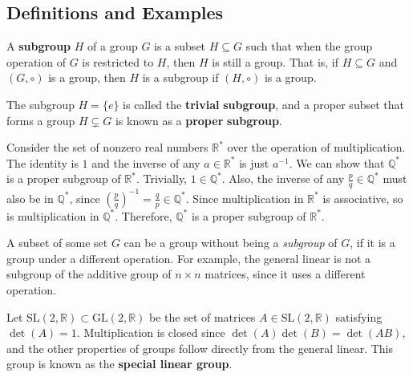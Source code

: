 \documentclass[12pt, letterpaper]{report}
\begin{document}
\subsection*{Definitions and Examples}
\begin{definition}[Subgroup]
	A \textbf{subgroup} \(H\) of a group \(G\) is a subset \(H \subseteq G\) such that when the group operation of \(G\) is restricted to \(H\), then \(H\) is still a group. That is, if \(H\subseteq G\) and \((G,\circ )\) is a group, then \(H\) is a subgroup if \((H,\circ )\) is a group.
\end{definition}
\begin{remark}
	The subgroup \(H=\{ e \} \) is called the \textbf{trivial} \textbf{subgroup}, and a proper subset that forms a group \(H \subsetneq G\) is known as a \textbf{proper} \textbf{subgroup}.
\end{remark}
\begin{eg}
	Consider the set of nonzero real numbers \(\mathbb{R} ^*\) over the operation of multiplication. The identity is \(1\) and the inverse of any \(a\in\mathbb{R} ^*\) is just \(a^{-1} \). We can show that \(\mathbb{Q} ^*\) is a proper subgroup of \(\mathbb{R} ^*\). Trivially, \(1\in\mathbb{Q}^* \). Also, the inverse of any \(\frac{p}{q}\in\mathbb{Q}^* \) must also be in \(\mathbb{Q}^* \), since \(\left( \frac{p}{q} \right)^{-1} =\frac{q}{p}\in\mathbb{Q} ^*\). Since multiplication in \(\mathbb{R} ^*\) is associative, so is multiplication in \(\mathbb{Q} ^*\). Therefore, \(\mathbb{Q} ^*\) is a proper subgroup of \(\mathbb{R} ^*\).
\end{eg}
\begin{remark}
	A subset of some set \(G\) can be a group without being a \emph{subgroup} of \(G\), if it is a group under a different operation. For example, the general linear is not a subgroup of the additive group of \(n\times n\) matrices, since it uses a different operation.
\end{remark}
\begin{eg}
	Let \(\text{SL}(2,\mathbb{R} )\subset\text{GL}(2,\mathbb{R} )  \) be the set of matrices \(A\in\text{SL}(2,\mathbb{R} ) \) satisfying \(\det (A)=1\). Multiplication is closed since \(\det (A)\det (B)=\det (AB)\), and the other properties of groups follow directly from the general linear. This group is known as the \textbf{special linear group}.
\end{eg}
\end{document}
